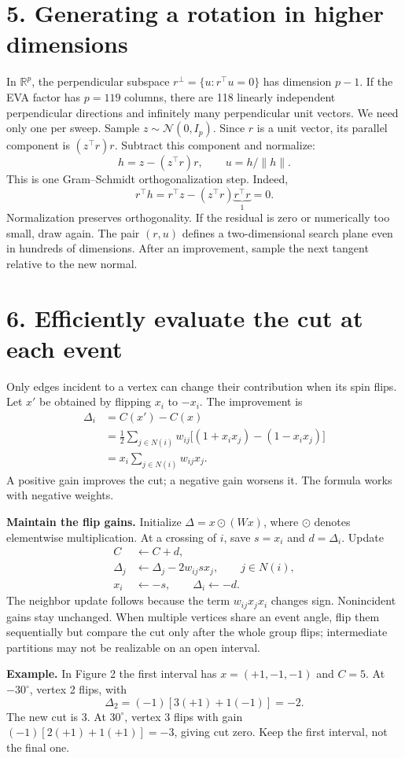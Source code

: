 \documentclass[11pt]{article}
\newcommand{\R}{\mathbb R}\newcommand{\sgn}{\operatorname{sgn}_{-}}
\newcommand{\sect}[1]{\section*{\textcolor{ink}{#1}}}
\begin{document}
\sect{5. Generating a rotation in higher dimensions}
In $\R^p$, the perpendicular subspace $r^\perp=\{u:r^\top u=0\}$ has dimension $p-1$. If the EVA factor has $p=119$ columns, there are 118 linearly independent perpendicular directions and infinitely many perpendicular unit vectors. We need only one per sweep.
Sample $z\sim\mathcal N(0,I_p)$. Since $r$ is a unit vector, its parallel component is $(z^\top r)r$. Subtract this component and normalize:
\begin{equation}
\boxed{h=z-(z^\top r)r,\qquad u=h/\|h\|}.
\end{equation}
This is one Gram--Schmidt orthogonalization step. Indeed,
\[
r^\top h=r^\top z-(z^\top r)\underbrace{r^\top r}_{1}=0.
\]
Normalization preserves orthogonality. If the residual is zero or numerically too small, draw again. The pair $(r,u)$ defines a two-dimensional search plane even in hundreds of dimensions. After an improvement, sample the next tangent relative to the new normal.
\newpage
\sect{6. Efficiently evaluate the cut at each event}
Only edges incident to a vertex can change their contribution when its spin flips. Let $x'$ be obtained by flipping $x_i$ to $-x_i$. The improvement is
\begin{align*}
\Delta_i&=C(x')-C(x)\\
&=\frac12\sum_{j\in N(i)}w_{ij}\big[(1+x_ix_j)-(1-x_ix_j)\big]\\
&=\boxed{x_i\sum_{j\in N(i)}w_{ij}x_j}.
\end{align*}
A positive gain improves the cut; a negative gain worsens it. The formula works with negative weights.

\textbf{Maintain the flip gains.} Initialize $\Delta=x\odot(Wx)$, where $\odot$ denotes elementwise multiplication. At a crossing of $i$, save $s=x_i$ and $d=\Delta_i$. Update
\begin{align*}
C&\leftarrow C+d,\\
\Delta_j&\leftarrow\Delta_j-2w_{ij}s x_j,\qquad j\in N(i),\\
x_i&\leftarrow-s,\qquad\Delta_i\leftarrow-d.
\end{align*}
The neighbor update follows because the term $w_{ij}x_jx_i$ changes sign. Nonincident gains stay unchanged. When multiple vertices share an event angle, flip them sequentially but compare the cut only after the whole group flips; intermediate partitions may not be realizable on an open interval.

\textbf{Example.} In Figure 2 the first interval has $x=(+1,-1,-1)$ and $C=5$. At $-30^\circ$, vertex 2 flips, with
\[
\Delta_2=(-1)[3(+1)+1(-1)]=-2.
\]
The new cut is $3$. At $30^\circ$, vertex 3 flips with gain $(-1)[2(+1)+1(+1)]=-3$, giving cut zero. Keep the first interval, not the final one.
\end{document}
